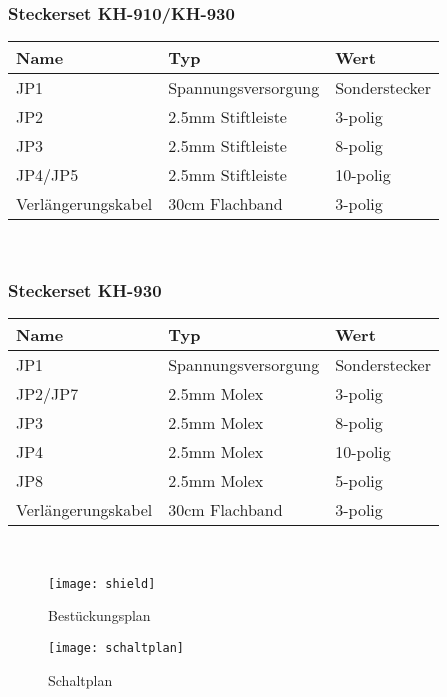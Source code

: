 \documentclass[fleqn,10pt]{SelfArx} %
\begin{document}
 \subsubsection*{Steckerset KH-910/KH-930}

\begin{tabular}{lll}
\hline
\textbf{Name}      & \textbf{Typ}        & \textbf{Wert}  \\ \hline
JP1                & Spannungsversorgung & Sonderstecker  \\ \hline
JP2                & 2.5mm Stiftleiste   & 3-polig        \\ \hline
JP3                & 2.5mm Stiftleiste   & 8-polig        \\ \hline
JP4/JP5            & 2.5mm Stiftleiste   & 10-polig       \\ \hline
Verlängerungskabel & 30cm Flachband      & 3-polig        \\ \hline
\end{tabular}\\

\subsubsection*{Steckerset KH-930}

\begin{tabular}{lll}
\hline
\textbf{Name}      & \textbf{Typ}        & \textbf{Wert}  \\ \hline
JP1                & Spannungsversorgung & Sonderstecker  \\ \hline
JP2/JP7            & 2.5mm Molex         & 3-polig        \\ \hline
JP3                & 2.5mm Molex         & 8-polig        \\ \hline
JP4                & 2.5mm Molex         & 10-polig       \\ \hline
JP8                & 2.5mm Molex         & 5-polig        \\ \hline
Verlängerungskabel & 30cm Flachband      & 3-polig        \\ \hline
\end{tabular}\\

 \begin{figure}[tbhp]\centering
 \texttt{[image: shield]}
 \caption{Bestückungsplan}
 \end{figure}

 \FloatBarrier

 \begin{figure*}[tbhp]\centering %
 \texttt{[image: schaltplan]}
 \caption{Schaltplan}
 \end{figure*}
\end{document}
